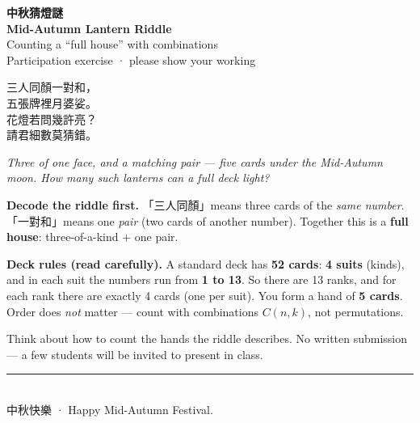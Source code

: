 \documentclass[11pt,a4paper,UTF8]{ctexart}
\begin{document}
\begin{center}
  {\Large\bfseries\color{night} 中秋猜燈謎}\\[0.25em]
  {\large\bfseries Mid-Autumn Lantern Riddle}\\[0.55em]
  {\normalsize Counting a ``full house'' with combinations}\\[0.7em]
  {\small Participation exercise · please show your working}
\end{center}

\vspace{0.4em}

\begin{tcolorbox}[
  enhanced,
  colback=paper,
  colframe=lantern,
  boxrule=1.1pt,
  arc=2mm,
  left=10pt,right=10pt,top=8pt,bottom=8pt,
  title={\bfseries 謎面 · The riddle},
  fonttitle=\color{white}\bfseries,
  coltitle=white,
  colbacktitle=lantern
]
\begin{center}
  {\large
  三人同顏一對和，\\[0.15em]
  五張牌裡月婆娑。\\[0.15em]
  花燈若問幾許亮？\\[0.15em]
  請君細數莫猜錯。
  }
\end{center}

\vspace{0.55em}
\textit{Three of one face, and a matching pair --- five cards under the Mid-Autumn moon.
How many such lanterns can a full deck light?}
\end{tcolorbox}

\vspace{0.7em}

\noindent\textbf{Decode the riddle first.}
「三人同顏」means three cards of the \emph{same number}.
「一對和」means one \emph{pair} (two cards of another number).
Together this is a \textbf{full house}: three-of-a-kind $+$ one pair.

\vspace{0.55em}

\noindent\textbf{Deck rules (read carefully).}
A standard deck has \textbf{52 cards}: \textbf{4 suits} (kinds), and in each suit the numbers run from \textbf{1 to 13}.
So there are 13 ranks, and for each rank there are exactly 4 cards (one per suit).
You form a hand of \textbf{5 cards}. Order does \emph{not} matter --- count with combinations $C(n,k)$, not permutations.

\vspace{0.85em}
\noindent
Think about how to count the hands the riddle describes.
No written submission --- a few students will be invited to present in class.

\vspace{0.8em}
\noindent\rule{\textwidth}{0.4pt}\\[0.55em]
{\small
中秋快樂 · Happy Mid-Autumn Festival.
}
\end{document}
